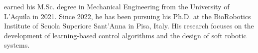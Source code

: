 earned his M.Sc. degree in Mechanical Engineering from the University of L'Aquila in 2021. Since 2022, he has been pursuing his Ph.D. at the BioRobotics Institute of Scuola Superiore Sant'Anna in Pisa, Italy. His research focuses on the development of learning-based control algorithms and the design of soft robotic systems.